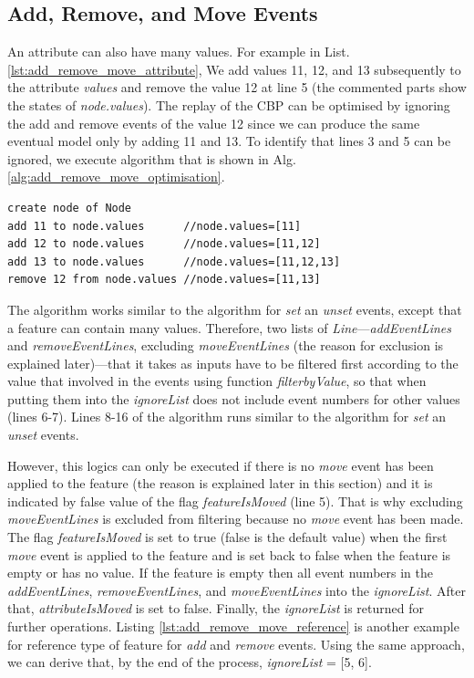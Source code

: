 \documentclass{llncs}
\begin{document}
\subsection{Add, Remove, and Move Events}
\label{subsec:add_remove_and_move_operations}
An attribute can also have many values. For example in List. \ref{lst:add_remove_move_attribute},  We add values 11, 12, and 13 subsequently to the attribute \emph{values} and remove the value 12 at line 5  (the commented parts show the states of \emph{node.values}). The replay of the CBP can be optimised by ignoring the add and remove events of the value 12 since we can produce the same eventual model only by adding 11 and 13. To identify that lines 3 and 5 can be ignored, we execute algorithm that is shown in Alg. \ref{alg:add_remove_move_optimisation}.  

\begin{lstlisting}[style=eol,caption={Example of CBP representation of attribute \emph{values}'s add and remove operations.},label=lst:add_remove_move_attribute]
create node of Node
add 11 to node.values      //node.values=[11] 
add 12 to node.values      //node.values=[11,12] 
add 13 to node.values      //node.values=[11,12,13] 
remove 12 from node.values //node.values=[11,13] 
\end{lstlisting}


The algorithm works similar to the algorithm for \emph{set} an \emph{unset} events, except that a feature can contain many values. Therefore, two lists of \emph{Line}---\emph{addEventLines} and \emph{removeEventLines}, excluding \emph{moveEventLines} (the reason for exclusion is explained later)---that it takes as inputs have to be filtered first according to the value that involved in the events using function \emph{filterbyValue}, so that when putting them into the \emph{ignoreList} does not include event numbers for other values (lines 6-7). Lines 8-16 of the algorithm runs similar to the algorithm for \emph{set} an \emph{unset} events. 
 
However, this logics can only be executed if there is no \emph{move} event has been applied to the feature (the reason is explained later in this section) and it is indicated by false value of the flag \emph{featureIsMoved} (line 5). That is why excluding \emph{moveEventLines} is excluded from filtering because no \emph{move} event has been made. The flag \emph{featureIsMoved} is set to true (false is the default value) when the first \emph{move} event is applied to the feature and is set back to false when the feature is empty or has no value. If the feature is empty then all event numbers in the \emph{addEventLines}, \emph{removeEventLines}, and \emph{moveEventLines} into the \emph{ignoreList}. After that, \emph{attributeIsMoved} is set to false. Finally, the \emph{ignoreList} is returned for further operations. Listing \ref{lst:add_remove_move_reference} is another example for reference type of feature for \emph{add} and \emph{remove} events. Using the same approach, we can derive that, by the end of the process, \emph{ignoreList} = [5, 6].       
\end{document}
